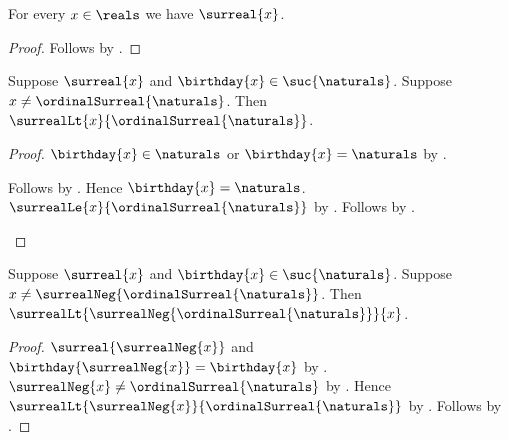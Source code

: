 \begin{corollary}\label{surreal_real_is_surreal}
    For every $x\in\reals$ we have $\surreal{x}$.
\end{corollary}
\begin{proof}
    Follows by
        .
\end{proof}

\begin{lemma}\label{surreal_successor_omega_stage_bound_above}
    Suppose $\surreal{x}$ and
        $\birthday{x}\in\suc{\naturals}$.
    Suppose $x\neq\ordinalSurreal{\naturals}$.
    Then $\surrealLt{x}{\ordinalSurreal{\naturals}}$.
\end{lemma}
\begin{proof}
    $\birthday{x}\in\naturals$ or $\birthday{x}=\naturals$
        by .
    \begin{byCase}
            Follows by
                .
            Hence $\birthday{x}=\naturals$.
            $\surrealLe{x}{\ordinalSurreal{\naturals}}$
                by
                .
            Follows by .
    \end{byCase}
\end{proof}

\begin{lemma}\label{surreal_successor_omega_stage_bound_below}
    Suppose $\surreal{x}$ and
        $\birthday{x}\in\suc{\naturals}$.
    Suppose $x\neq\surrealNeg{\ordinalSurreal{\naturals}}$.
    Then
        $\surrealLt{\surrealNeg{\ordinalSurreal{\naturals}}}{x}$.
\end{lemma}
\begin{proof}
    $\surreal{\surrealNeg{x}}$ and
        $\birthday{\surrealNeg{x}}=\birthday{x}$
        by
        .
    $\surrealNeg{x}\neq\ordinalSurreal{\naturals}$
        by .
    Hence
        $\surrealLt{\surrealNeg{x}}{\ordinalSurreal{\naturals}}$
        by .
    Follows by
        .
\end{proof}

